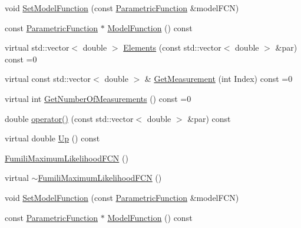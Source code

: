 \begin{DoxyCompactItemize}
\item 
void \mbox{\hyperlink{classROOT_1_1Minuit2_1_1FumiliMaximumLikelihoodFCN_a1aef27a37fc3a8df63aed6aff19c0c33}{Set\+Model\+Function}} (const \mbox{\hyperlink{classROOT_1_1Minuit2_1_1ParametricFunction}{Parametric\+Function}} \&model\+F\+CN)
\item 
const \mbox{\hyperlink{classROOT_1_1Minuit2_1_1ParametricFunction}{Parametric\+Function}} $\ast$ \mbox{\hyperlink{classROOT_1_1Minuit2_1_1FumiliMaximumLikelihoodFCN_ae1ea41126186d9dd5c83fdcec08cff70}{Model\+Function}} () const
\item 
virtual std\+::vector$<$ double $>$ \mbox{\hyperlink{classROOT_1_1Minuit2_1_1FumiliMaximumLikelihoodFCN_a20aa81dc23ba61ed49ba78f4f9627e59}{Elements}} (const std\+::vector$<$ double $>$ \&par) const =0
\item 
virtual const std\+::vector$<$ double $>$ \& \mbox{\hyperlink{classROOT_1_1Minuit2_1_1FumiliMaximumLikelihoodFCN_ac3e28c8d3e14a1df3145891ae99ac35d}{Get\+Measurement}} (int Index) const =0
\item 
virtual int \mbox{\hyperlink{classROOT_1_1Minuit2_1_1FumiliMaximumLikelihoodFCN_af0a6b5a302f978363074039c7d55d529}{Get\+Number\+Of\+Measurements}} () const =0
\item 
double \mbox{\hyperlink{classROOT_1_1Minuit2_1_1FumiliMaximumLikelihoodFCN_ad06826a1cde84be6bf2a13518c768ca5}{operator()}} (const std\+::vector$<$ double $>$ \&par) const
\item 
virtual double \mbox{\hyperlink{classROOT_1_1Minuit2_1_1FumiliMaximumLikelihoodFCN_ab945da701895bfba143da08f76ba2d05}{Up}} () const
\item 
\mbox{\hyperlink{classROOT_1_1Minuit2_1_1FumiliMaximumLikelihoodFCN_ad62f29a2682f961ea769c2596a799abb}{Fumili\+Maximum\+Likelihood\+F\+CN}} ()
\item 
virtual \mbox{\hyperlink{classROOT_1_1Minuit2_1_1FumiliMaximumLikelihoodFCN_ac0973b05cf2e22b6124281d7adf6b90e}{$\sim$\+Fumili\+Maximum\+Likelihood\+F\+CN}} ()
\item 
void \mbox{\hyperlink{classROOT_1_1Minuit2_1_1FumiliMaximumLikelihoodFCN_a1aef27a37fc3a8df63aed6aff19c0c33}{Set\+Model\+Function}} (const \mbox{\hyperlink{classROOT_1_1Minuit2_1_1ParametricFunction}{Parametric\+Function}} \&model\+F\+CN)
\item 
const \mbox{\hyperlink{classROOT_1_1Minuit2_1_1ParametricFunction}{Parametric\+Function}} $\ast$ \mbox{\hyperlink{classROOT_1_1Minuit2_1_1FumiliMaximumLikelihoodFCN_ae1ea41126186d9dd5c83fdcec08cff70}{Model\+Function}} () const

\end{DoxyCompactItemize}
